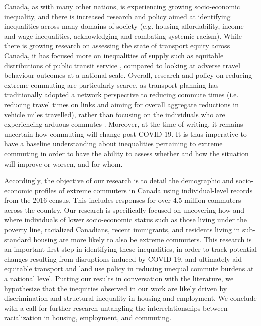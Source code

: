 \documentclass[10 pt,letterpaper]{article}
\begin{document}
Canada, as with many other nations, is experiencing growing socio-economic inequality, and there is increased research and policy aimed at identifying inequalities across many domains of society (e.g. housing affordability, income and wage inequalities, acknowledging and combating systemic racism). While there is growing research on assessing the state of transport equity across Canada, it has focused more on inequalities of supply such as equitable distributions of public transit service \cite{deboosere_evaluating_2018,allen_sizing_2019}, compared to looking at adverse travel behaviour outcomes at a national scale. Overall, research and policy on reducing extreme commuting are particularly scarce, as transport planning has traditionally adopted a network perspective to reducing commute times (i.e. reducing travel times on links and aiming for overall aggregate reductions in vehicle miles travelled), rather than focusing on the individuals who are experiencing arduous commutes \cite{martens_transport_2016}. Moreover, at the time of writing, it remains uncertain how commuting will change post COVID-19. It is thus imperative to have a baseline understanding about inequalities pertaining to extreme commuting in order to have the ability to assess whether and how the situation will improve or worsen, and for whom.

Accordingly, the objective of our research is to detail the demographic and socio-economic profiles of extreme commuters in Canada using individual-level records from the 2016 census. This includes responses for over 4.5 million commuters across the country. Our research is specifically focused on uncovering how and where individuals of lower socio-economic status such as those living under the poverty line, racialized Canadians, recent immigrants, and residents living in sub-standard housing are more likely to also be extreme commuters. This research is an important first step in identifying these inequalities, in order to track potential changes resulting from disruptions induced by COVID-19, and ultimately aid equitable transport and land use policy in reducing unequal commute burdens at a national level. Putting our results in conversation with the literature, we hypothesize that the inequities observed in our work are likely driven by discrimination and structural inequality in housing and employment. We conclude with a call for further research untangling the interrelationships between racialization in housing, employment, and commuting.
\end{document}
